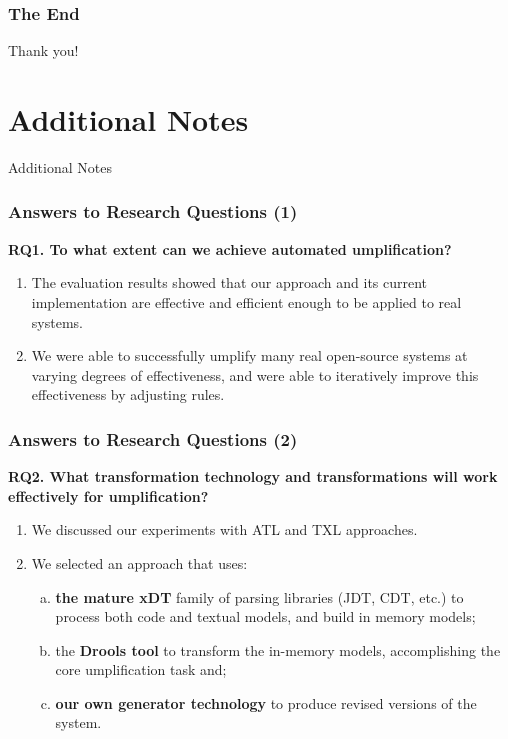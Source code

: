 \documentclass[xcolor=table]{beamer}
\begin{document}
\begin{frame}
\frametitle{The End}
\centering
\LARGE{\textcolor{important}{Thank you!}}
\end{frame}


\section{Additional Notes}
\begin{frame}
\centering
\textcolor{important}{{\fontsize{40}{50}\selectfont Additional Notes}}
\end{frame}

\begin{frame}
\frametitle{Answers to Research Questions (1)}
\textcolor{important}{\textbf{RQ1. To what extent can we achieve automated umplification?}}
\begin{enumerate}
\item The evaluation results showed that our approach and its current implementation are effective and efficient enough to be applied to real systems. 
\item We were able to successfully umplify many real open-source systems at varying degrees of effectiveness, and were able to iteratively improve this effectiveness by adjusting rules.
\end{enumerate}
\end{frame}

\begin{frame}
\frametitle{Answers to Research Questions (2)}
\textcolor{important}{\textbf{RQ2. What transformation technology and transformations  will work effectively for umplification?}}
\begin{enumerate}
\item We discussed our experiments with ATL and TXL approaches.
\item We selected an approach that uses: 
	\begin{enumerate}[(a)] 
	\item \textbf{the mature xDT} family of parsing libraries (JDT, CDT, etc.) to process both code and 			   textual models, and build in memory models;
	\item the \textbf{Drools tool} to transform the in-memory models, accomplishing the core umplification   task and;
	\item \textbf{our own generator technology} to produce revised versions of the system.
	\end{enumerate}
\end{enumerate}
\end{frame}
\end{document}
